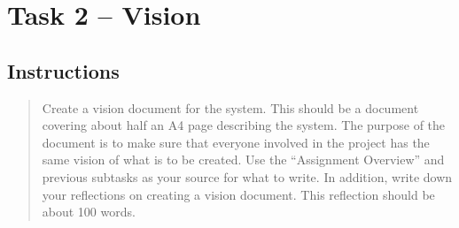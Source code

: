 \section{Task 2 -- Vision}\label{task-2-vision}

\subsection{Instructions}\label{instructions}

\begin{quote}
Create a vision document for the system. This should be a document
covering about half an A4 page describing the system. The purpose of the
document is to make sure that everyone involved in the project has the
same vision of what is to be created. Use the ``Assignment Overview''
and previous subtasks as your source for what to write. In addition,
write down your reflections on creating a vision document. This
reflection should be about 100 words.
\end{quote}
